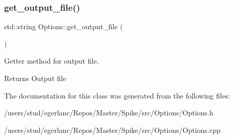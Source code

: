 \subsubsection{\texorpdfstring{get\+\_\+output\+\_\+file()}{get\_output\_file()}}
{\footnotesize\ttfamily std\+::string Options\+::get\+\_\+output\+\_\+file (\begin{DoxyParamCaption}{ }\end{DoxyParamCaption})\hspace{0.3cm}{\ttfamily [inline]}}



Getter method for output file. 

\begin{DoxyReturn}{Returns}
Output file 
\end{DoxyReturn}


The documentation for this class was generated from the following files\+:\begin{DoxyCompactItemize}
\item 
/users/stud/egerlanc/\+Repos/\+Master/\+Spike/src/\+Options/Options.\+h\item 
/users/stud/egerlanc/\+Repos/\+Master/\+Spike/src/\+Options/Options.\+cpp\end{DoxyCompactItemize}
